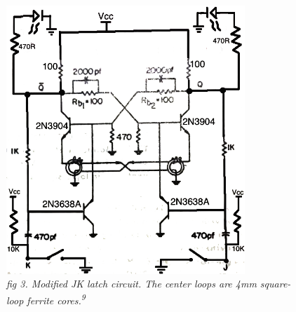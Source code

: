 \documentclass{article}
\begin{document}
\begin{figure}[h]

\includegraphics[width=9cm]{img/flipflop.png}
\caption{\small\emph{fig 3. Modified JK latch circuit. The center loops are 4mm square-loop ferrite cores.\textsuperscript{9}}}
\end{figure}

\newpage
\end{document}
